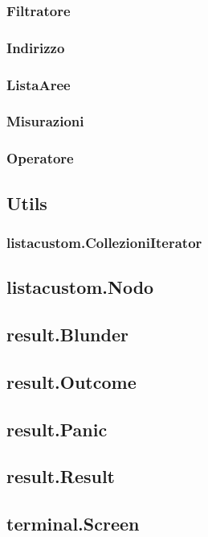 \documentclass[a4paper, 12pt,twoside]{article}
\begin{document}
			\subsubsection{Filtratore}
			\subsubsection{Indirizzo}
			\subsubsection{ListaAree}
			\subsubsection{Misurazioni}
			\subsubsection{Operatore}
		
		
		
		\subsection{Utils}
			\subsubsection{listacustom.CollezioniIterator}
			\subsection{listacustom.Nodo}
			\subsection{result.Blunder}
			\subsection{result.Outcome}
			\subsection{result.Panic}
			\subsection{result.Result}
			
			\subsection{terminal.Screen}
\end{document}
